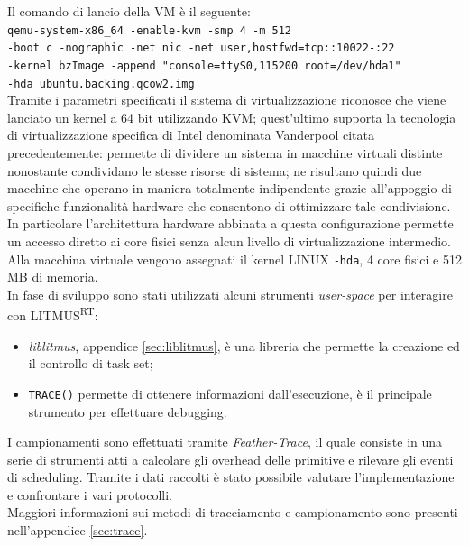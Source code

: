 \noindent Il comando di lancio della VM è il seguente:\\

\noindent \texttt{qemu-system-x86\_64 -enable-kvm -smp 4 -m 512 \\
-boot c -nographic -net nic -net user,hostfwd=tcp::10022-:22 \\
-kernel bzImage -append "console=ttyS0,115200 root=/dev/hda1" \\ 
-hda ubuntu.backing.qcow2.img}\\

\noindent Tramite i parametri specificati il sistema di virtualizzazione riconosce che viene lanciato un kernel a 64 bit utilizzando KVM; quest'ultimo supporta la tecnologia di virtualizzazione specifica di Intel denominata Vanderpool citata precedentemente: permette di dividere un sistema in macchine virtuali distinte nonostante condividano le stesse risorse di sistema; ne risultano quindi due macchine che operano in maniera totalmente indipendente grazie all'appoggio di specifiche funzionalità hardware che consentono di ottimizzare tale condivisione. In particolare l'architettura hardware abbinata a questa configurazione permette un accesso diretto ai core fisici senza alcun livello di virtualizzazione intermedio.\\
Alla macchina virtuale vengono assegnati il kernel LINUX \texttt{-hda}, 4 core fisici e 512 MB di memoria.\\

\noindent In fase di sviluppo sono stati utilizzati alcuni strumenti \textit{user-space} per interagire con LITMUS\textsuperscript{RT}:

\begin{itemize}
  \item \textit{liblitmus}, appendice \ref{sec:liblitmus}, è una libreria che permette la creazione ed il controllo di task set;
  \item \texttt{TRACE()} permette di ottenere informazioni dall'esecuzione, è il principale strumento per effettuare debugging.\\
\end{itemize}

\noindent I campionamenti sono effettuati tramite \textit{Feather-Trace}, il quale consiste in una serie di strumenti atti a calcolare gli overhead delle primitive e rilevare gli eventi di scheduling. Tramite i dati raccolti è stato possibile valutare l'implementazione e confrontare i vari protocolli.\\
Maggiori informazioni sui metodi di tracciamento e campionamento sono presenti nell'appendice \ref{sec:trace}.\\

